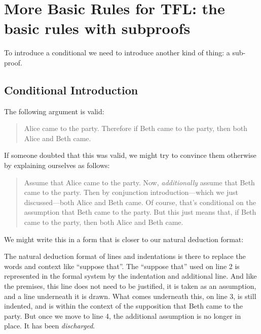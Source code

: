 \chapter{More Basic Rules for TFL: the basic rules with subproofs}

To introduce a conditional we need to introduce another kind of thing: a sub-proof.

\section{Conditional Introduction}
The following argument is valid:
	\begin{quote}
		Alice came to the party. Therefore if Beth came to the party, then both Alice and Beth came.
	\end{quote}
If someone doubted that this was valid, we might try to convince them otherwise by explaining ourselves as follows:
	\begin{quote}
		Assume that Alice came to the party. Now, \emph{additionally} assume that Beth came to the party. Then by conjunction introduction---which we just discussed---both Alice and Beth came. Of course, that's conditional on the assumption that Beth came to the party. But this just means that, if Beth came to the party, then both Alice and Beth came.
	\end{quote}

We might write this in a form that is closer to our natural deduction format:
\begin{fitchproof}
	\open
		\close
\end{fitchproof}\medskip
The natural deduction format of lines and indentations is there to replace the words and context like ``suppose that''. The ``suppose that'' used on line 2 is represented in the formal system by the indentation and additional line. And like the premises, this line does not need to be justified, it is taken as an assumption, and a line underneath it is drawn. What comes underneath this, on line 3, is still indented, and is within the context of the supposition that Beth came to the party. But once we move to line 4, the additional assumption is no longer in place. It has been \emph{discharged}.

